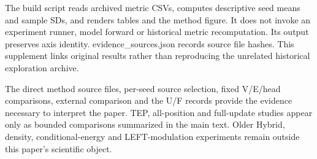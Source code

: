\documentclass[
  english,
  9pt,
]{article}
\begin{document}
The build script reads archived metric CSVs, computes descriptive seed
means and sample SDs, and renders tables and the method figure. It does
not invoke an experiment runner, model forward or historical metric
recomputation. Its output preserves axis identity.
evidence\_sources.json records source file hashes. This supplement links
original results rather than reproducing the unrelated historical
exploration archive.

The direct method source files, per-seed source selection, fixed
V/E/head comparisons, external comparison and the U/F records provide
the evidence necessary to interpret the paper. TEP, all-position and
full-update studies appear only as bounded comparisons summarized in the
main text. Older Hybrid, density, conditional-energy and LEFT-modulation
experiments remain outside this paper's scientific object.
\end{document}
